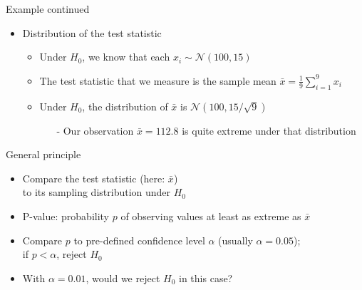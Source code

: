 	\begin{frame}[c]{Example continued}
		
		\begin{itemize}
			
			\item \alert{Distribution of the test statistic} 
			\begin{itemize}
				\item Under $H_0$, we know that each $x_i \sim \mathcal{N}(100,15)$
				\smallskip
				\item The \alert{test statistic} that we measure is the sample
				mean $\bar{x} = \frac{1}{9} \sum_{i=1}^9 x_i$
				\bigskip
				\pause
				\item Under $H_0$, the distribution of $\bar{x}$ is
				$\mathcal{N}(100,15/\sqrt{9})$
				\begin{itemize}
					\item[-] Our observation $\bar{x}=112.8$ is quite extreme under that
					distribution
				\end{itemize}
			\end{itemize}	
		\end{itemize}
		
		\begin{center}
			
		\end{center}
		
	\end{frame}
	\begin{frame}[c]{General principle}
		
		\vspace*{-0.2cm}
		\begin{center}
			
		\end{center}
		\vspace*{-0.2cm}
		
		\begin{itemize}
			\item Compare the test statistic (here: $\bar{x}$)\\to its sampling
			distribution under $H_0$
			\pause 
			\medskip
			\item \alert{P-value}: probability $p$ of observing values \alert{at least as extreme as $\bar{x}$}\\
			\pause 
			\medskip
			\item Compare $p$ to pre-defined confidence level $\alpha$ (usually
			$\alpha=0.05$);\\\alert{if $p < \alpha$, reject $H_0$}
			\pause 
			\medskip
			\item With $\alpha = 0.01$, would we reject $H_0$ in this case?
		\end{itemize}
		
	\end{frame}
